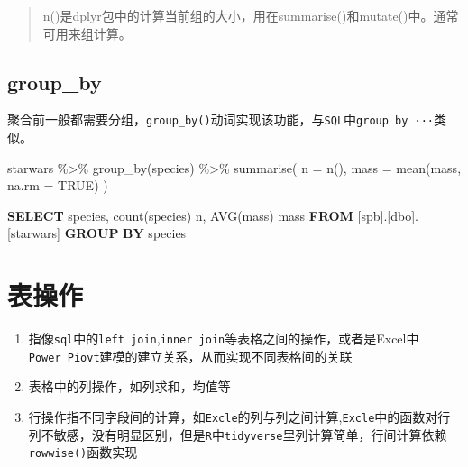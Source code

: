 \documentclass[
]{book}
\newenvironment{Shaded}{\begin{snugshade}}{\end{snugshade}}
\newcommand{\AttributeTok}[1]{\textcolor[rgb]{0.77,0.63,0.00}{#1}}
\newcommand{\ConstantTok}[1]{\textcolor[rgb]{0.00,0.00,0.00}{#1}}
\newcommand{\FunctionTok}[1]{\textcolor[rgb]{0.00,0.00,0.00}{#1}}
\newcommand{\KeywordTok}[1]{\textcolor[rgb]{0.13,0.29,0.53}{\textbf{#1}}}
\newcommand{\NormalTok}[1]{#1}
\newcommand{\SpecialCharTok}[1]{\textcolor[rgb]{0.00,0.00,0.00}{#1}}
\begin{document}
\begin{quote}
n()是dplyr包中的计算当前组的大小，用在summarise()和mutate()中。通常可用来组计算。
\end{quote}

\hypertarget{group_by}{%
\subsection{group\_by}\label{group_by}}

聚合前一般都需要分组，\texttt{group\_by()}动词实现该功能，与\texttt{SQL}中\texttt{group\ by\ ···}类似。

\begin{Shaded}
\begin{Highlighting}[]
\NormalTok{starwars }\SpecialCharTok{\%\textgreater{}\%}
  \FunctionTok{group\_by}\NormalTok{(species) }\SpecialCharTok{\%\textgreater{}\%}
  \FunctionTok{summarise}\NormalTok{(}
    \AttributeTok{n =} \FunctionTok{n}\NormalTok{(),}
    \AttributeTok{mass =} \FunctionTok{mean}\NormalTok{(mass, }\AttributeTok{na.rm =} \ConstantTok{TRUE}\NormalTok{)}
\NormalTok{  )}
\end{Highlighting}
\end{Shaded}

\begin{Shaded}
\begin{Highlighting}[]
\KeywordTok{SELECT}\NormalTok{ species,}
  \FunctionTok{count}\NormalTok{(species) n,}
  \FunctionTok{AVG}\NormalTok{(mass) mass}
\KeywordTok{FROM}\NormalTok{ [spb].[dbo].[starwars]}
\KeywordTok{GROUP} \KeywordTok{BY}\NormalTok{  species}
\end{Highlighting}
\end{Shaded}

\hypertarget{ux8868ux64cdux4f5c}{%
\section{表操作}\label{ux8868ux64cdux4f5c}}

\begin{enumerate}
\def\labelenumi{\arabic{enumi}.}
\item
  指像\texttt{sql}中的\texttt{left\ join},\texttt{inner\ join}等表格之间的操作，或者是Excel中\texttt{Power\ Piovt}建模的建立关系，从而实现不同表格间的关联
\item
  表格中的列操作，如列求和，均值等
\item
  行操作指不同字段间的计算，如\texttt{Excle}的列与列之间计算,\texttt{Excle}中的函数对行列不敏感，没有明显区别，但是\texttt{R}中\texttt{tidyverse}里列计算简单，行间计算依赖\texttt{rowwise()}函数实现
\end{enumerate}
\end{document}
